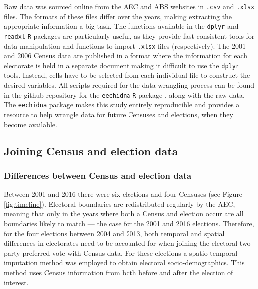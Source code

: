 \documentclass[11pt,a4paper,]{article}
\begin{document}
Raw data was sourced online from the AEC and ABS websites in \texttt{.csv} and \texttt{.xlsx} files. The formats of these files differ over the years, making extracting the appropriate information a big task. The functions available in the \texttt{dplyr} \autocite{dplyr} and \texttt{readxl} \autocite{readxl} \texttt{R} packages are particularly useful, as they provide fast consistent tools for data manipulation and functions to import \texttt{.xlsx} files (respectively). The 2001 and 2006 Census data are published in a format where the information for each electorate is held in a separate document making it difficult to use the \texttt{dplyr} tools. Instead, cells have to be selected from each individual file to construct the desired variables. All scripts required for the data wrangling process can be found in the github repository for the \texttt{eechidna} \texttt{R} package \autocite{eechidna}, along with the raw data. The \texttt{eechidna} package makes this study entirely reproducible and provides a resource to help wrangle data for future Censuses and elections, when they become available.

\hypertarget{joining-census-and-election-data}{%
\subsection{Joining Census and election data}\label{joining-census-and-election-data}}

\hypertarget{differences-between-census-and-election-data}{%
\subsubsection{Differences between Census and election data}\label{differences-between-census-and-election-data}}

Between 2001 and 2016 there were six elections and four Censuses (see Figure \ref{fig:timeline}). Electoral boundaries are redistributed regularly by the AEC, meaning that only in the years where both a Census and election occur are all boundaries likely to match --- the case for the 2001 and 2016 elections. Therefore, for the four elections between 2004 and 2013, both temporal and spatial differences in electorates need to be accounted for when joining the electoral two-party preferred vote with Census data. For these elections a spatio-temporal imputation method was employed to obtain electoral socio-demographics. This method uses Census information from both before and after the election of interest.
\end{document}
